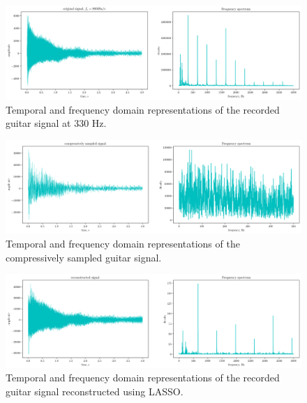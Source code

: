 \documentclass[10pt,a4paper,twoside]{article}
\begin{document}
\begin{figure}[!htb]
	\centering
	\includegraphics[width=0.85\linewidth]{E1_original.png}
	\caption{Temporal and frequency domain representations of the recorded guitar signal at 330 Hz.}
	\label{fig:record-orig}
\end{figure}

\begin{figure}[!htb]
	\centering
	\includegraphics[width=0.85\linewidth]{E1_comp.png}
	\caption{Temporal and frequency domain representations of the compressively sampled guitar signal.}
	\label{fig:record-comp}
\end{figure}

\begin{figure}[!htb]
	\centering
	\includegraphics[width=0.85\linewidth]{E1_recon_lasso.png}
	\caption{Temporal and frequency domain representations of the recorded guitar signal reconstructed using LASSO.}
	\label{fig:record-recon-lasso}
\end{figure}


\end{document}
